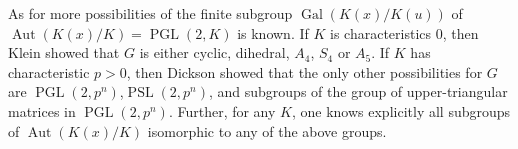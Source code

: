 As for more possibilities of the finite subgroup $\operatorname{Gal}(K(x)/K(u))$ of $\operatorname{Aut}(K(x)/K)=\operatorname{PGL}(2,K)$ is known. If $K$ is characteristics 0, then Klein showed that $G$ is either cyclic, dihedral, $A_4$, $S_4$ or $A_5$. If $K$ has characteristic $p>0$, then Dickson showed that the only other possibilities for $G$ are $\operatorname{PGL}(2,p^n)$,$\operatorname{PSL}(2,p^n)$, and subgroups of the group of upper-triangular matrices in $\operatorname{PGL}(2,p^n)$. Further, for any $K$, one knows explicitly all subgroups of $\operatorname{Aut}(K(x)/K)$ isomorphic to any of the above groups. 


